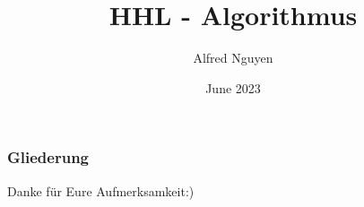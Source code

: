 \documentclass{beamer}
\title{HHL - Algorithmus}
\author{Alfred Nguyen}
\institute{Fakultät der Informatik \\
Technische Universität München \\
  85758 Garching, Bavaria
}
\date{June 2023}
\begin{document}
  \frame{\titlepage}
  \begin{frame}
    \frametitle{Gliederung}
    \tableofcontents
  \end{frame}
  








\begin{frame}

  \begin{center}
    Danke für Eure Aufmerksamkeit:)
  \end{center}

\end{frame}

\begin{frame}


\end{frame}


%
\end{document}
